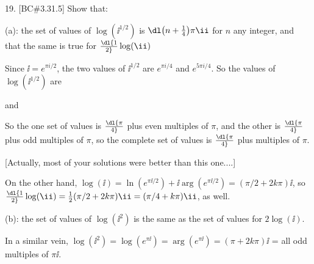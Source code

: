\vfill
\eject


\item{19.} [BC\#3.31.5] Show that:


\ssk


\item{(a):} the set of values of $\log(\ii^{1/2})$ is $\dl \big(n+{{1}\over{4}}\big)\pi\ii$ for $n$ any integer,
and that the same is true for $\dl{{1}\over{2}}\log(\ii)$


\msk

\item{} Since $\ii=e^{\pi i/2}$, the two values of $\ii^{1/2}$ are $e^{\pi i/4}$ and $e^{5\pi i/4}$.
So the values of $\log(\ii^{1/2})$ are

\ssk


\item{} and

\ssk


\ssk

\item{} So the one set of values is $\dl {{\pi}\over{4}}$ plus even multiples of $\pi$, and the other is
$\dl {{\pi}\over{4}}$ plus odd multiples of $\pi$, so the complete set of values is $\dl {{\pi}\over{4}}$
plus  multiples of $\pi$.

\ssk

\item{} [Actually, most of your solutions were better than this one....]

\msk

\item{} On the other hand, $\log(\ii)=\ln(e^{\pi\ii/2})+\ii\arg(e^{\pi\ii/2}) = (\pi/2+2k\pi)\ii$, so
$\dl{{1}\over{2}}\log(\ii) = {{1}\over{2}}(\pi/2+2k\pi)\ii = (\pi/4+k\pi)\ii$, as well.

\bsk


\item{(b):} the set of values of $\log(\ii^2)$ is  the same as the set of values for $2\log(\ii)$.

\msk

\item{} In a similar vein, $\log(\ii^2)= \log(e^{\pi\ii})=\arg(e^{\pi\ii}) = 
(\pi+2k\pi)\ii$ = all odd multiples of $\pi\ii$.

